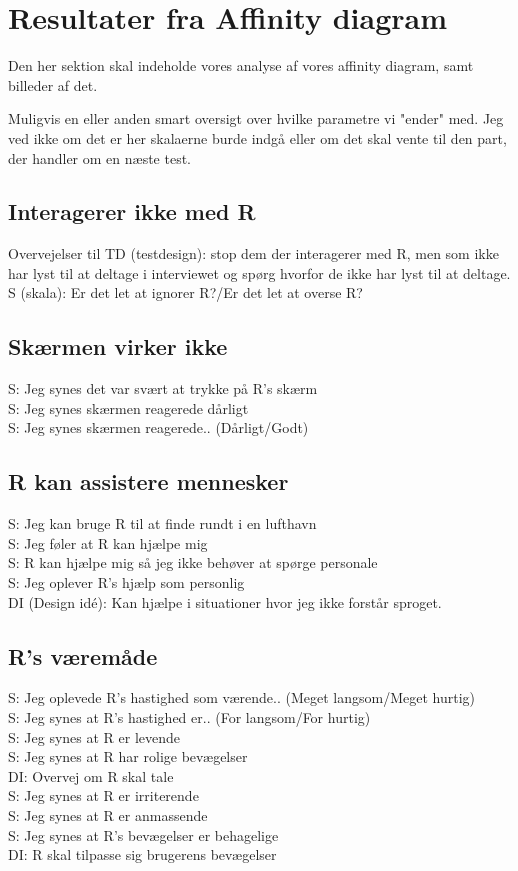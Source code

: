 \section{Resultater fra Affinity diagram}
\label{ParametreDatabehandlingAffinityDiagram}
%
Den her sektion skal indeholde vores analyse af vores affinity diagram, samt billeder af det. 

Muligvis en eller anden smart oversigt over hvilke parametre vi "ender" med. Jeg ved ikke om det er her skalaerne burde indgå eller om det skal vente til den part, der handler om en næste test. 

\subsection{Interagerer ikke med R}
%
Overvejelser til TD (testdesign): stop dem der interagerer med R, men som ikke har lyst til at deltage i interviewet og spørg hvorfor de ikke har lyst til at deltage. \\
S (skala): Er det let at ignorer R?/Er det let at overse R?

\subsection{Skærmen virker ikke}
%
S: Jeg synes det var svært at trykke på R's skærm\\
S: Jeg synes skærmen reagerede dårligt\\
S: Jeg synes skærmen reagerede.. (Dårligt/Godt)\\

\subsection{R kan assistere mennesker}
%
S: Jeg kan bruge R til at finde rundt i en lufthavn\\
S: Jeg føler at R kan hjælpe mig\\
S: R kan hjælpe mig så jeg ikke behøver at spørge personale\\
S: Jeg oplever R's hjælp som personlig\\
DI (Design idé): Kan hjælpe i situationer hvor jeg ikke forstår sproget. 

\subsection{R's væremåde}
%
S: Jeg oplevede R's hastighed som værende.. (Meget langsom/Meget hurtig)\\
S: Jeg synes at R's hastighed er.. (For langsom/For hurtig)\\
S: Jeg synes at R er levende\\
S: Jeg synes at R har rolige bevægelser\\
DI: Overvej om R skal tale\\
S: Jeg synes at R er irriterende\\
S: Jeg synes at R er anmassende\\
S: Jeg synes at R's bevægelser er behagelige\\
DI: R skal tilpasse sig brugerens bevægelser

